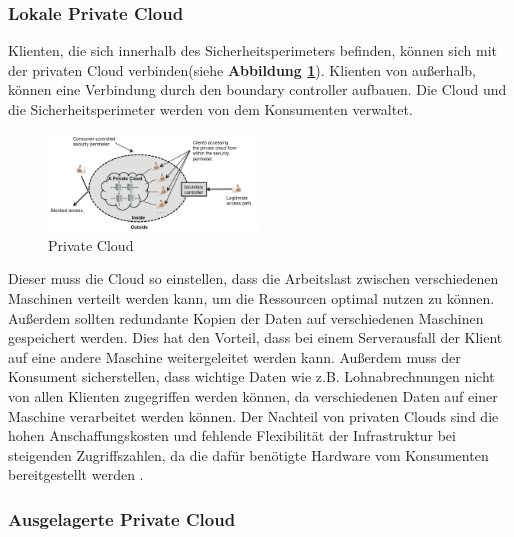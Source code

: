 \subsubsection{Lokale Private Cloud}
Klienten, die sich innerhalb des Sicherheitsperimeters befinden, können sich mit der privaten Cloud verbinden(siehe \textbf{Abbildung \ref{PrivateCloud}}). 
Klienten von außerhalb, können eine Verbindung durch den \glqq boundary controller\grqq{} aufbauen. Die Cloud und die Sicherheitsperimeter werden von dem Konsumenten verwaltet.
\begin{figure}[h]
    \centering
	\includegraphics[width=0.5\textwidth]{Images/On-sitePrivateCloud}
	\caption{Private Cloud \cite{Badger}}
	\label{PrivateCloud}
\end{figure}
Dieser muss die Cloud so einstellen, dass die Arbeitslast zwischen verschiedenen Maschinen verteilt werden kann, um die Ressourcen optimal nutzen zu können. Außerdem sollten redundante Kopien der Daten auf verschiedenen Maschinen 
gespeichert werden. Dies hat den Vorteil, dass bei einem Serverausfall der Klient auf eine andere Maschine weitergeleitet werden kann.
Außerdem muss der Konsument sicherstellen, dass wichtige Daten wie z.B. Lohnabrechnungen nicht von allen Klienten zugegriffen werden können,
da verschiedenen Daten auf einer Maschine verarbeitet werden können. Der Nachteil von privaten Clouds sind die hohen Anschaffungskosten und fehlende Flexibilität der Infrastruktur bei steigenden Zugriffszahlen, da die dafür benötigte Hardware vom Konsumenten bereitgestellt werden \cite{Badger}.

\subsubsection{Ausgelagerte Private Cloud}

